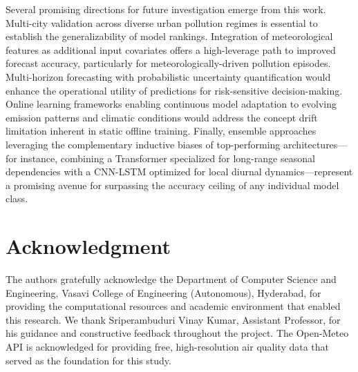 \documentclass[conference]{IEEEtran}
\begin{document}
Several promising directions for future investigation emerge from this work. Multi-city validation across diverse urban pollution regimes is essential to establish the generalizability of model rankings. Integration of meteorological features as additional input covariates offers a high-leverage path to improved forecast accuracy, particularly for meteorologically-driven pollution episodes. Multi-horizon forecasting with probabilistic uncertainty quantification would enhance the operational utility of predictions for risk-sensitive decision-making. Online learning frameworks enabling continuous model adaptation to evolving emission patterns and climatic conditions would address the concept drift limitation inherent in static offline training. Finally, ensemble approaches leveraging the complementary inductive biases of top-performing architectures---for instance, combining a Transformer specialized for long-range seasonal dependencies with a CNN-LSTM optimized for local diurnal dynamics---represent a promising avenue for surpassing the accuracy ceiling of any individual model class.

\section*{Acknowledgment}

The authors gratefully acknowledge the Department of Computer Science and Engineering, Vasavi College of Engineering (Autonomous), Hyderabad, for providing the computational resources and academic environment that enabled this research. We thank Sriperambuduri Vinay Kumar, Assistant Professor, for his guidance and constructive feedback throughout the project. The Open-Meteo API is acknowledged for providing free, high-resolution air quality data that served as the foundation for this study.
\end{document}
